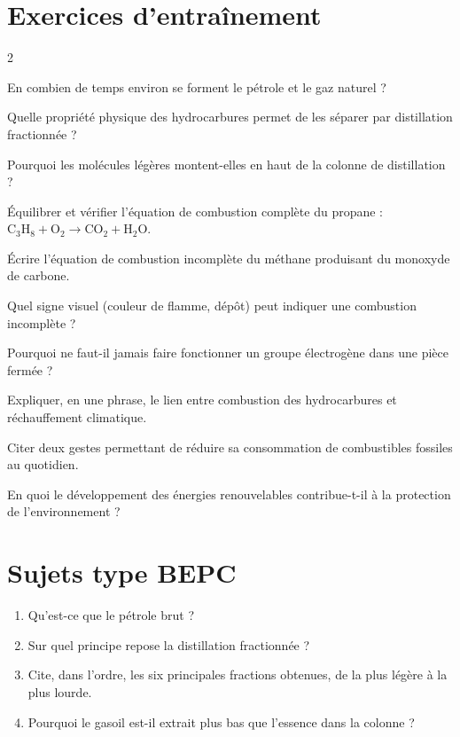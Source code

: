 \section{Exercices d'entraînement}
\begin{multicols}{2}

\exo{} En combien de temps environ se forment le pétrole et le gaz naturel ?

\exo{} Quelle propriété physique des hydrocarbures permet de les séparer par
distillation fractionnée ?

\exo{} Pourquoi les molécules légères montent-elles en haut de la colonne de
distillation ?

\exo{} Équilibrer et vérifier l'équation de combustion complète du propane :
$\mathrm{C_3H_8+O_2\longrightarrow CO_2+H_2O}$.

\exo{} Écrire l'équation de combustion incomplète du méthane produisant du
monoxyde de carbone.

\exo{} Quel signe visuel (couleur de flamme, dépôt) peut indiquer une combustion
incomplète ?

\exo{} Pourquoi ne faut-il jamais faire fonctionner un groupe électrogène dans une
pièce fermée ?

\exo{} Expliquer, en une phrase, le lien entre combustion des hydrocarbures et
réchauffement climatique.

\exo{} Citer deux gestes permettant de réduire sa consommation de combustibles
fossiles au quotidien.

\exo{} En quoi le développement des énergies renouvelables contribue-t-il à la
protection de l'environnement ?

\end{multicols}

\section{Sujets type BEPC}

\begin{enumerate}[label=\arabic*)]
\item Qu'est-ce que le pétrole brut ?
\item Sur quel principe repose la distillation fractionnée ?
\item Cite, dans l'ordre, les six principales fractions obtenues, de la plus légère à la
plus lourde.
\item Pourquoi le gasoil est-il extrait plus bas que l'essence dans la colonne ?
\end{enumerate}

